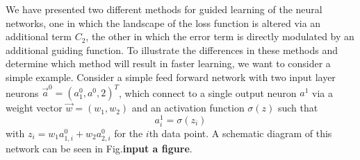 We have presented two different methods for guided learning of the neural networks, one in which the landscape of the loss function is altered via an additional term $C_{2}$, the other in which the error term is directly modulated by an additional guiding function. To illustrate the differences in these methods and determine which method will result in faster learning, we want to consider a simple example. Consider a simple feed forward network with two input layer neurons $\vec{a}^0=(a^0_1, a^0, 2)^T$, which connect to a single output neuron $a^1$ via a weight vector $\vec{w}=(w_1, w_2)$ and an activation function $\sigma(z)$ such that
\begin{equation}
a^1_i=\sigma(z_i)
\end{equation}
with $z_i=w_{1}a^0_{1, i}+w_{2}a^0_{2, i}$ for the $i$th data point. A schematic diagram of this network can be seen in Fig.{\bf input a figure}. 

